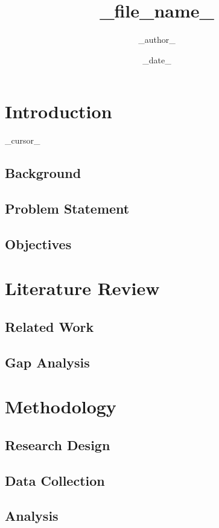 \documentclass[12pt]{report}
\title{{{_file_name_}}}
\author{{{_author_}}}
\date{{{\_date\_}}}
\begin{document}
\maketitle

\tableofcontents
\listoffigures
\listoftables

\chapter{Introduction}
{{_cursor_}}

\section{Background}

\section{Problem Statement}

\section{Objectives}

\chapter{Literature Review}

\section{Related Work}

\section{Gap Analysis}

\chapter{Methodology}

\section{Research Design}

\section{Data Collection}

\section{Analysis}
\end{document}
